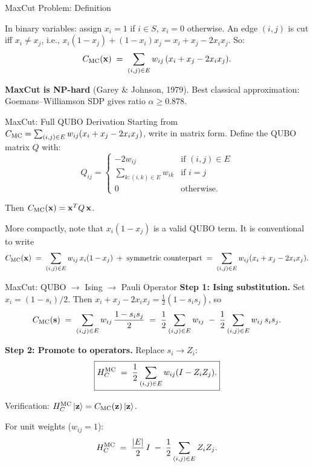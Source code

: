 \documentclass{beamer}
\begin{document}
\begin{frame}
\begin{frame}{MaxCut Problem: Definition}
\medskip

In binary variables: assign $x_i = 1$ if $i\in S$, $x_i=0$ otherwise.
An edge $(i,j)$ is cut iff $x_i \neq x_j$, i.e., $x_i(1-x_j) +
(1-x_i)x_j = x_i + x_j - 2x_ix_j$. So:
\[
C_{\rm MC}(\mathbf{x}) \;=\;
\sum_{(i,j)\in E} w_{ij}\,(x_i + x_j - 2x_ix_j).
\]

\textbf{MaxCut is NP-hard} (Garey \& Johnson, 1979). Best classical
approximation: Goemans--Williamson SDP gives ratio $\alpha \ge 0.878$.
\end{frame}


\begin{frame}{MaxCut: Full QUBO Derivation}
Starting from $C_{\rm MC} = \sum_{(i,j)\in E}w_{ij}(x_i+x_j-2x_ix_j)$,
write in matrix form. Define the QUBO matrix $Q$ with:
\[
Q_{ij} = \begin{cases}
-2w_{ij} & \text{if }(i,j)\in E \\
\sum_{k:(i,k)\in E} w_{ik} & \text{if } i=j \\
0 & \text{otherwise.}
\end{cases}
\]

Then $C_{\rm MC}(\mathbf{x}) = \mathbf{x}^T Q\,\mathbf{x}$.

\medskip

More compactly, note that $x_i(1-x_j)$ is a valid QUBO term.
It is conventional to write
\[
C_{\rm MC}(\mathbf{x}) \;=\; \sum_{(i,j)\in E} w_{ij}\,x_i(1-x_j)
\;+\; \text{symmetric counterpart}
\;=\;\sum_{(i,j)\in E} w_{ij}(x_i + x_j - 2x_ix_j).
\]
\end{frame}


\begin{frame}{MaxCut: QUBO $\to$ Ising $\to$ Pauli Operator}
\textbf{Step 1: Ising substitution.} Set $x_i = (1-s_i)/2$. Then
$x_i + x_j - 2x_ix_j = \tfrac{1}{2}(1 - s_is_j)$, so
\[
C_{\rm MC}(\mathbf{s}) \;=\;
\sum_{(i,j)\in E} w_{ij}\,\frac{1-s_is_j}{2}
\;=\; \frac{1}{2}\sum_{(i,j)\in E}w_{ij}
\;-\; \frac{1}{2}\sum_{(i,j)\in E}w_{ij}\,s_is_j.
\]

\textbf{Step 2: Promote to operators.} Replace $s_i \to Z_i$:
\[
\boxed{
H_C^{\rm MC} \;=\; \frac{1}{2}\sum_{(i,j)\in E} w_{ij}(I - Z_iZ_j).}
\]

Verification: $H_C^{\rm MC}\ket{\mathbf{z}} = C_{\rm MC}(\mathbf{z})\ket{\mathbf{z}}$.

For unit weights ($w_{ij}=1$):
\[
H_C^{\rm MC} \;=\; \frac{|E|}{2}\,I \;-\; \frac{1}{2}\sum_{(i,j)\in E}Z_iZ_j.
\]


\end{frame}
\end{frame}
\end{document}
